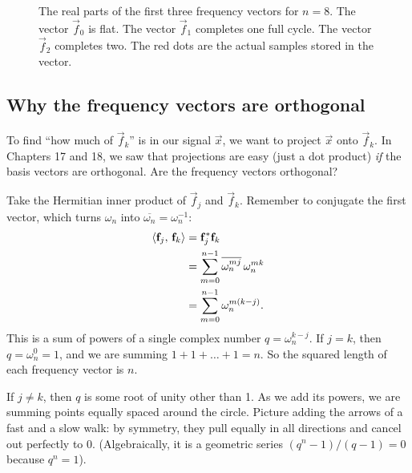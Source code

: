 \begin{figure}[htbp]
\centering
{}
\caption{The real parts of the first three frequency vectors for $n=8$. The vector $\vec f_0$ is flat. The vector $\vec f_1$ completes one full cycle. The vector $\vec f_2$ completes two. The red dots are the actual samples stored in the vector.}
\label{ch32:fourierrows}
\end{figure}

\subsection{Why the frequency vectors are orthogonal}

To find ``how much of $\vec f_k$'' is in our signal $\vec x$, we want to project $\vec x$ onto $\vec f_k$. In Chapters 17 and 18, we saw that projections are easy (just a dot product) \emph{if} the basis vectors are orthogonal. Are the frequency vectors orthogonal?

Take the Hermitian inner product of $\vec f_j$ and $\vec f_k$. Remember to conjugate the first vector, which turns $\omega_n$ into $\overline{\omega_n} = \omega_n^{-1}$:
\begin{align*}
  \langle \mathbf{f}_j,\, \mathbf{f}_k \rangle &= \mathbf{f}_j^* \mathbf{f}_k \\
  &= \sum_{m=0}^{n-1} \overline{\omega_n^{mj}} \, \omega_n^{mk} \\
  &= \sum_{m=0}^{n-1} \omega_n^{m(k-j)}.
\end{align*}
This is a sum of powers of a single complex number $q = \omega_n^{k-j}$.
If $j=k$, then $q = \omega_n^0 = 1$, and we are summing $1 + 1 + \dots + 1 = n$. So the squared length of each frequency vector is $n$.

If $j \neq k$, then $q$ is some root of unity other than 1. As we add its powers, we are summing points equally spaced around the circle. Picture adding the arrows of a fast and a slow walk: by symmetry, they pull equally in all directions and cancel out perfectly to $0$. (Algebraically, it is a geometric series $(q^n-1)/(q-1) = 0$ because $q^n = 1$). 


